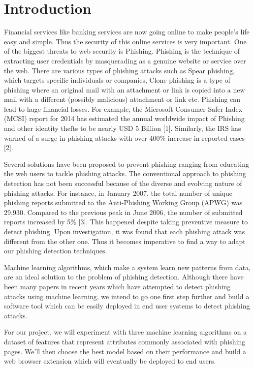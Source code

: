 \documentclass[conference]{IEEEtran}
\begin{document}
\section{Introduction}
\par Financial services like banking services are now going online to make people's life easy and simple. Thus the security of this online services is
very important. One of the biggest threats to web security
is Phishing. Phishing is the technique of extracting user
credentials by masquerading as a genuine website or service
over the web. There are various types of phishing attacks
such as Spear phishing, which targets specific individuals
or companies, Clone phishing is a type of phishing where
an original mail with an attachment or link is copied into
a new mail with a different (possibly malicious) attachment
or link etc. Phishing can lead to huge financial
losses. For example, the Microsoft Consumer Safer Index
(MCSI) report for 2014 has estimated the annual worldwide
impact of Phishing and other identity thefts to be nearly USD
5 Billion [1]. Similarly, the IRS has warned of a surge in
phishing attacks with over 400\% increase in reported cases [2].
\par Several solutions have been proposed to prevent phishing
ranging from educating the web users to tackle phishing attacks. The conventional approach to phishing detection has not been successful because of the diverse and
evolving nature of phishing attacks. For instance, in January
2007, the total number of unique phishing reports submitted
to the Anti-Phishing Working Group (APWG) was 29,930.
Compared to the previous peak in June 2006, the number
of submitted reports increased by 5\% [3]. This happened
despite taking preventive measure to detect phishing. Upon
investigation, it was found that each phishing attack was
different from the other one. Thus it becomes imperative to
find a way to adapt our phishing detection techniques.
\par Machine learning algorithms, which make a system learn
new patterns from data, are an ideal solution to the problem of
phishing detection. Although there have been many papers in
recent years which have attempted to detect phishing attacks
using machine learning, we intend to go one first step further
and build a software tool which can be easily deployed in
end user systems to detect phishing attacks.
\par For our project, we will experiment with three machine
learning algorithms on a dataset of features that represent
attributes commonly associated with phishing pages. We'll then choose
the best model based on their performance and build a web
browser extension which will eventually be deployed to end
users.
\end{document}
